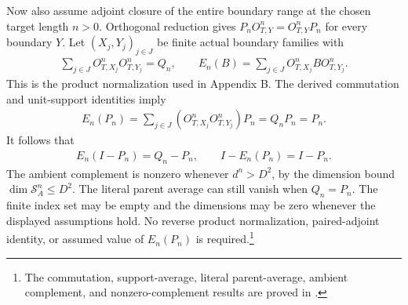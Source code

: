 \documentclass{article}
\begin{document}
Now also assume adjoint closure of the entire boundary range at the
chosen target length $n>0$. Orthogonal reduction gives
$P_nO^n_{T,Y}=O^n_{T,Y}P_n$ for every boundary $Y$. Let
$(X_j,Y_j)_{j\in J}$ be finite actual boundary families with
\begin{align}
    \sum_{j\in J}O^n_{T,X_j}O^n_{T,Y_j}=Q_n,
    \qquad E_n(B)=\sum_{j\in J}O^n_{T,X_j}BO^n_{T,Y_j}.
    \label{eq:glm23_wha_parent_normalized_family}
\end{align}
This is the product normalization used in Appendix B. The derived
commutation and unit-support identities imply
\begin{align}
    E_n(P_n)=\sum_{j\in J}(O^n_{T,X_j}O^n_{T,Y_j})P_n=Q_nP_n=P_n.
    \label{eq:glm23_wha_parent_support_average}
\end{align}
It follows that
\begin{align}
    E_n(I-P_n)=Q_n-P_n,\qquad I-E_n(P_n)=I-P_n.
    \label{eq:glm23_wha_parent_parent_average}
\end{align}
The ambient complement is nonzero whenever $d^n>D^2$, by the dimension
bound $\dim\mathcal S_A^n\leq D^2$. The literal parent average can
still vanish when $Q_n=P_n$. The finite index set may be empty and the dimensions may be zero
whenever the displayed assumptions hold. No reverse product
normalization, paired-adjoint identity, or assumed value of $E_n(P_n)$
is required.\footnote{
    The commutation, support-average, literal parent-average, ambient
    complement, and nonzero-complement results are proved in
    .}
\end{document}
